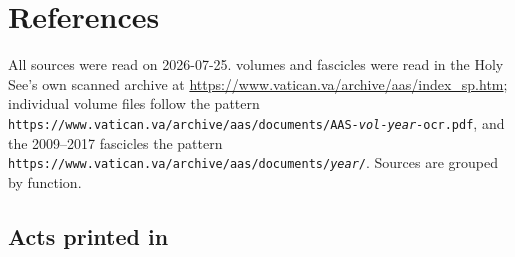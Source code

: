 \section{References}

All sources were read on 2026-07-25. 
volumes and fascicles were read in the Holy See's own scanned archive at
\url{https://www.vatican.va/archive/aas/index_sp.htm}; individual volume
files follow the pattern
\texttt{https://www.vatican.va/archive/aas/documents/AAS-\textit{vol}-\textit{year}-ocr.pdf},
and the 2009--2017 fascicles the pattern
\texttt{https://www.vatican.va/archive/aas/documents/\textit{year}/}.
Sources are grouped by function.

\subsection*{Acts printed in }

